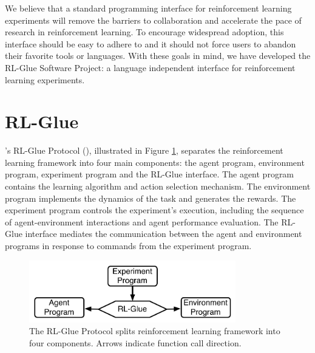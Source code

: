 \documentclass[twoside,11pt]{article}
\begin{document}
We believe that a standard programming interface for reinforcement learning experiments will remove the barriers to collaboration and accelerate the pace of research in reinforcement learning.  To encourage widespread adoption, this interface should be easy to adhere to and it should not force users to abandon their favorite tools or languages.  With these goals in mind, we have developed the RL-Glue Software Project: a language independent interface for reinforcement learning experiments.





	 

\section{RL-Glue}


\citeauthor{whiteThesis}'s RL-Glue Protocol (\citeyear{whiteThesis}), illustrated in Figure \ref{fig:RLDIA}, separates the reinforcement learning framework into four main components: the agent program, environment program, experiment program and the RL-Glue interface. The agent program contains the learning algorithm and action selection mechanism. The environment program implements the dynamics of the task and generates the rewards. The experiment program controls the experiment's execution, including the sequence of agent-environment interactions and agent performance evaluation.  The RL-Glue interface mediates the communication between the agent and environment programs in response to commands from the experiment program. 

\begin{figure}[ht]
\begin{center}
\includegraphics[width=9cm]{glue.pdf}
\vspace{-0.2cm}
\caption{\small The RL-Glue Protocol splits reinforcement learning framework into four components.  Arrows indicate function call direction.}\label{fig:RLDIA}
\end{center}
\vspace{-0.4cm}
\end{figure}
\end{document}
